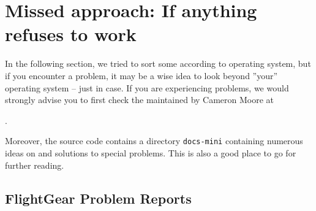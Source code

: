 
\chapter{Missed approach: If anything refuses to work\label{missed}}

In the following section, we tried to sort some  according to operating system,
but if you encounter a problem, it may be a wise idea to look beyond ''your'' operating system -- just in case. If you are experiencing problems, we would strongly advise you to first check the  maintained by Cameron Moore at

.

Moreover, the source code contains a directory \texttt{docs-mini} containing numerous
ideas on and solutions to special problems. This is also a good place to go for further reading.

\section{FlightGear Problem Reports}

